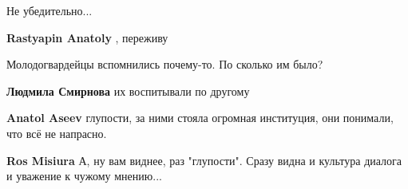 \begin{itemize}
\begin{itemize}
\end{itemize}

 
Не убедительно...

\begin{itemize}
 
\textbf{Rastyapin Anatoly} , переживу
\end{itemize}

 
Молодогвардейцы вспомнились почему-то. По сколько им было?

\begin{itemize}
 
\textbf{Людмила Смирнова} их воспитывали по другому

 
\textbf{Anatol Aseev} глупости, за ними стояла огромная институция, они понимали, что всё не напрасно.

 
\textbf{Ros Misiura} А, ну вам виднее, раз "глупости". Сразу видна и культура диалога и уважение к чужому мнению...
\end{itemize}


\end{itemize}
